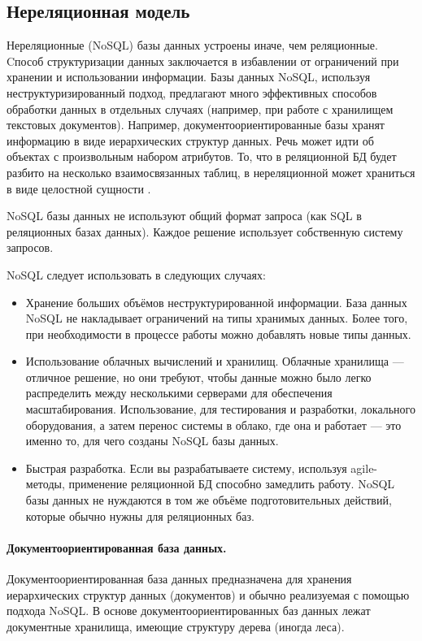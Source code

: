 \subsection{Нереляционная модель}
Нереляционные (NoSQL) базы данных устроены иначе, чем реляционные.  Cпособ структуризации данных заключается в избавлении от ограничений при хранении и использовании информации. Базы данных NoSQL, используя неструктуризированный подход, предлагают много эффективных способов обработки данных в отдельных случаях (например, при работе с хранилищем текстовых документов). Например, документоориентированные базы хранят информацию в виде иерархических структур данных. Речь может идти об объектах с произвольным набором атрибутов. То, что в реляционной БД будет разбито на несколько взаимосвязанных таблиц, в нереляционной может храниться в виде целостной сущности \cite{sqlnsql2}.

NoSQL базы данных не используют общий формат запроса (как SQL в реляционных базах данных). Каждое решение использует собственную систему запросов.

NoSQL следует использовать в следующих случаях\cite{sqlnsql3}:
\begin{itemize}
	\item Хранение больших объёмов неструктурированной информации. База данных NoSQL не накладывает ограничений на типы хранимых данных. Более того, при необходимости в процессе работы можно добавлять новые типы данных.
	
	\item Использование облачных вычислений и хранилищ. Облачные хранилища — отличное решение, но они требуют, чтобы данные можно было легко распределить между несколькими серверами для обеспечения масштабирования. Использование, для тестирования и разработки, локального оборудования, а затем перенос системы в облако, где она и работает — это именно то, для чего созданы NoSQL базы данных.
	
	\item Быстрая разработка. Если вы разрабатываете систему, используя agile-методы, применение реляционной БД способно замедлить работу. NoSQL базы данных не нуждаются в том же объёме подготовительных действий, которые обычно нужны для реляционных баз.
\end{itemize}

\paragraph{Документоориентированная база данных.}
Документоориентированная база данных предназначена для хранения иерархических структур данных (документов) и обычно реализуемая с помощью подхода NoSQL. В основе документоориентированных баз данных лежат документные хранилища, имеющие структуру дерева (иногда леса). 

